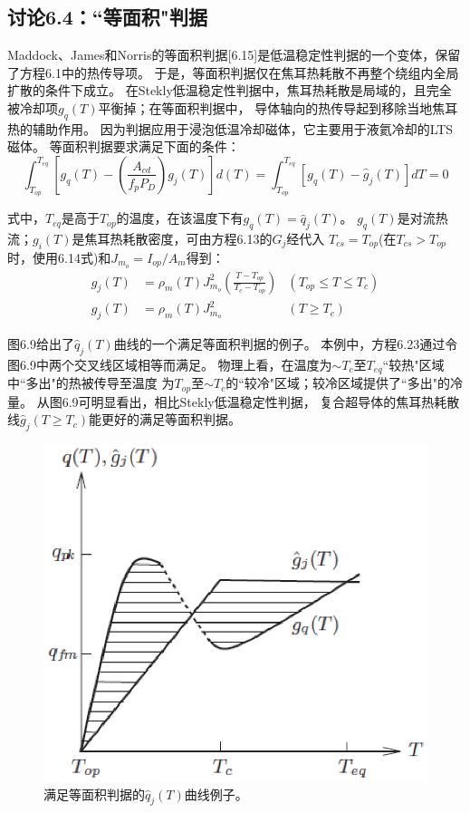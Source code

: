 \subsection{讨论6.4：``等面积"判据}
Maddock、James和Norris的等面积判据[6.15]是低温稳定性判据的一个变体，保留了方程6.1中的热传导项。
于是，等面积判据仅在焦耳热耗散不再整个绕组内全局扩散的条件下成立。
在Stekly低温稳定性判据中，焦耳热耗散是局域的，且完全被冷却项$g_q(T)$平衡掉；在等面积判据中，
导体轴向的热传导起到移除当地焦耳热的辅助作用。
因为判据应用于浸泡低温冷却磁体，它主要用于液氦冷却的LTS磁体。
等面积判据要求满足下面的条件：
\begin{equation}%
\int_{T_{op}}^{T_{eq}}[g_q(T)-(\frac{A_{cd}}{f_pP_D})g_j(T)]d(T)
=\int_{T_{op}}^{T_{eq}}[g_q(T)-\hat{g}_j(T)]dT=0
\end{equation}

式中，$T_{eq}$是高于$T_{op}$的温度，在该温度下有$g_q(T)=\hat{q}_j(T)$。
$g_q(T)$是对流热流；$g_i(T)$是焦耳热耗散密度，可由方程6.13的$G_j$经代入
$T_{cs}=T_{op}$(在$T_{cs}>T_{op}$时，使用6.14式)和$J_{m_o}=I_{op}/A_m$得到：
\begin{subequations}
	\begin{align}
	g_j(T)&=\rho_m(T)J_{m_o}^2(\frac{T-T_{op}}{T_c-T_{op}}) &(T_{op}\leq T \leq T_c)\\
	g_j(T)&=\rho_m(T)J_{m_o}^2 &(T \geq T_c)
	\end{align}
\end{subequations}

图6.9给出了$\hat{q}_j(T)$曲线的一个满足等面积判据的例子。
本例中，方程6.23通过令图6.9中两个交叉线区域相等而满足。
物理上看，在温度为$\sim T_c$至$T_{eq}$``较热"区域中``多出"的热被传导至温度
为$T_{op}$至$\sim T_{c}$的``较冷"区域；较冷区域提供了``多出"的冷量。
从图6.9可明显看出，相比Stekly低温稳定性判据，
复合超导体的焦耳热耗散线$\hat{g}_j(T\ge T_c)$能更好的满足等面积判据。
\begin{figure}[htbp]
	\centering
	\includegraphics[scale=0.7]{chpt6/figs/fig6.9.eps}
	\caption{满足等面积判据的$\hat{q}_j(T)$曲线例子。}
\end{figure}

